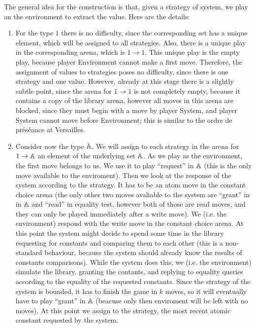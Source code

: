 The general idea for the construction is that, given a strategy of system, we play an the environment to extract the value. 
Here are the details:
\begin{enumerate}
    \item For the type $1$ there is no difficulty, since the corresponding set has a unique element, which will be assigned to all strategies. Also, there is a unique play in the corresponding arena, which is $1 \to 1$. This unique play is  the empty play,  because player Environment cannot make a first move. Therefore, the assignment of values to strategies poses no difficulty, since there is one strategy and one value.  However, already at this stage there is a slightly subtle point, since the arena for $1 \to 1$ is not completely empty, because it  contains a copy of the library arena, however all moves in this arena are blocked, since they must begin with a move by player System, and player System cannot  move before Environment; this is similar to the ordre de préséance at Versailles.
    \item Consider now the type $\mathbb A$.  We will assign to each strategy in the arena for
    $1 \to \mathbb A$ an element of the underlying set $\mathbb A$.
    As we play as the environment, the first move belongs to us. 
    We use it to play ``request'' in $\mathbb A$ (this is the only move 
    available to the enviroment). Then we look at the response of the system according to the strategy.
    It has to be an atom move in the constant choice arena (the only other two moves 
    avaliable to the system are ``grant'' in in $\mathbb A$ and ``read'' in equality test, 
    however both of those are read moves, and they can only be played immediately after a 
    write move). We (i.e. the environment) respond with the write move in the constant choice arena. 
    At this point the system might decide to spend some time in the library requesting 
    for constants and comparing them to each other (this is a non-standard 
    behaviour, because the system should already know the results of constants comparisons). 
    While the system does this, we (i.e. the environment) simulate the library, granting the contants, and replying 
    to equality queries according to the equality of the requested constants.    
    Since the strategy of the system is bounded, it has to finish the game in $k$ moves, 
    so it will eventually have to play ``grant'' in $\mathbb A$ (beacuse only then enviroment will be left with no moves). 
    At this point we assign to the strategy, the most recent atomic constant requested by the system.


\end{enumerate}
